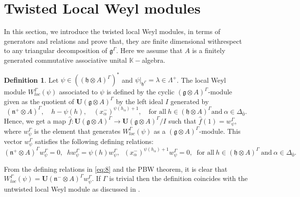 \documentclass[11pt]{amsart}
\theoremstyle{plain}
\theoremstyle{definition}
\newtheorem{defn}[thm]{Definition}
\newcommand{\g}{\mathfrak{g}}
\newcommand{\h}{\mathfrak{h}}
\newcommand{\n}{\mathfrak{n}}
\begin{document}
\section{Twisted Local Weyl modules}\label{sec:8}
 In this section, we introduce the twisted local Weyl modules, in terms of generators and relations and prove that, they are finite dimensional withrespect to any triangular decomposition of $\g^{\Gamma}$. Here we assume that $A$ is a finitely generated commutative associative unital $\mathbb{K}-$algebra.
\begin{defn}\label{def:7}
Let $\psi\in ((\h\otimes A)^{\Gamma})^{*}$ and $\psi|_{\h^{\Gamma}}=\lambda\in \Lambda^{+}$. The local Weyl module $W^{\Gamma}_{loc}(\psi)$ associated to $\psi$ is defined by the cyclic $(\g\otimes A)^{\Gamma}$-module given as the quotient of $\mathbf{U}(\g\otimes A)^{\Gamma}$ by the left ideal $I$ generated by 
\begin{equation*}
    (\n^{+}\otimes A)^{\Gamma},\quad h-\psi(h),\quad (x_{\alpha}^{-})^{\psi(h_{\alpha})+1},\quad \mbox{for all}~h\in (\h\otimes A)^{\Gamma} \mbox{and}~\alpha\in\Delta_{\bar{0}}.
\end{equation*}
Hence, we get a map $\hat{f}:\mathbf{U}(\g\otimes A)^{\Gamma}\rightarrow\mathbf{U}(\g\otimes A)^{\Gamma}/I$ such that $\hat{f}(1)=w_{\psi}^{\Gamma}$, where $w_{\psi}^{\Gamma}$ is the element that generates $W_{loc}^{\Gamma}(\psi)$ as a $(\g\otimes A)^{\Gamma}$-module. This vector $w_{\psi}^{\Gamma}$ satisfies the following defining relations:
\begin{equation}\label{eq:8}
    (\n^{+}\otimes A)^{\Gamma}w_{\psi}^{\Gamma}=0,\;\; hw_{\psi}^{\Gamma}=\psi(h)w_{\psi}^{\Gamma}, \;\; (x_{\alpha}^{-})^{\psi(h_{\alpha})+1}w_{\psi}^{\Gamma}=0, \;\; \mbox{for all}~h\in(\h\otimes A)^{\Gamma}~\mbox{and}~\alpha\in\Delta_{\bar{0}}.
\end{equation}
\end{defn}
From the defining relations in \eqref{eq:8} and the PBW theorem, it is clear that $W^{\Gamma}_{loc}(\psi)=\mathbf{U}(\n^{-}\otimes A)^{\Gamma}w_{\psi}^{\Gamma}$. If $\Gamma$ is trivial then the definition coincides with the untwisted local Weyl module as discussed in \cite{CLS19}.
\end{document}
